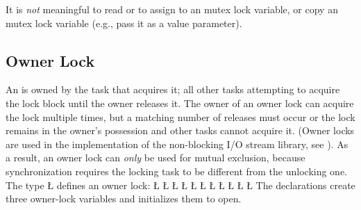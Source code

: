 \documentclass[openright,twoside]{report}
\begin{document}
It is \emph{not} meaningful to read or to assign to an mutex lock variable, or copy an mutex lock variable (e.g., pass it as a value parameter).


\subsection{Owner Lock}
\label{s:OwnerLock}

An  is owned by the task that acquires it;
all other tasks attempting to acquire the lock block until the owner releases it.
The owner of an owner lock can acquire the lock multiple times, but a matching number of releases must occur or the lock remains in the owner's possession and other tasks cannot acquire it.
(Owner locks are used in the implementation of the non-blocking I/O stream library, see ).
As a result, an owner lock can \emph{only} be used for mutual exclusion, because synchronization requires the locking task to be different from the unlocking one.
The type \LGinlinetrue\LGbegin\lgrinde\L{}\endlgrinde\LGend{} defines an owner lock:
\LGinlinefalse\LGbegin\lgrinde
\L{}
\L{}
\L{\LB{}}
\L{\LB{}}
\L{\LB{}}
\L{\LB{}}
\L{\LB{}}
\L{\LB{}}
\L{\LB{\};}}
\L{}
\L{}
\endlgrinde\LGend
{}%
%
%
%
%
The declarations create three owner-lock variables and initializes them to open.
\end{document}
